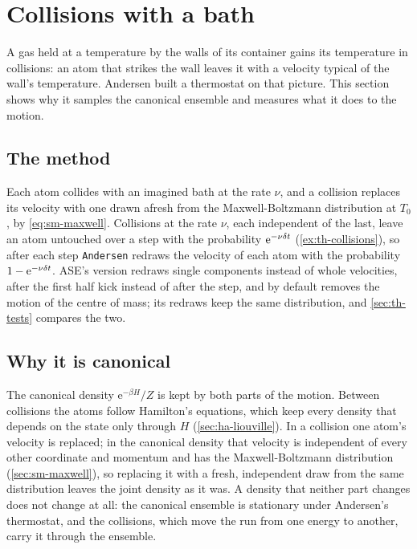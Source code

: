 \section{Collisions with a bath}
\label{sec:th-andersen}

A gas held at a temperature by the walls of its container gains its
temperature in collisions: an atom that strikes the wall leaves it with a
velocity typical of the wall's temperature. Andersen built a thermostat
on that picture\cite{Andersen1980}. This section shows why it samples the
canonical ensemble and measures what it does to the motion.

\subsection*{The method}

Each atom collides with an imagined bath at the rate $\nu$, and a
collision replaces its velocity with one drawn afresh from the
Maxwell-Boltzmann distribution at $T_0$, by \cref{eq:sm-maxwell}.
Collisions at the rate $\nu$, each independent of the last, leave an atom
untouched over a step with the probability $\mathrm{e}^{-\nu\delta t}$
(\cref{ex:th-collisions}), so after each step \texttt{Andersen} redraws
the velocity of each atom with the probability $1 - \mathrm{e}^{-\nu\delta t}$.
ASE's version redraws single components instead of whole velocities,
after the first half kick instead of after the step, and by default
removes the motion of the centre of mass; its redraws keep the same
distribution, and \cref{sec:th-tests} compares the two.

\subsection*{Why it is canonical}

The canonical density $\mathrm{e}^{-\beta H}/Z$ is kept by both parts of
the motion. Between collisions the atoms follow Hamilton's equations,
which keep every density that depends on the state only through $H$
(\cref{sec:ha-liouville}). In a collision one atom's velocity is replaced;
in the canonical density that velocity is independent of every other
coordinate and momentum and has the Maxwell-Boltzmann distribution
(\cref{sec:sm-maxwell}), so replacing it with a fresh, independent draw
from the same distribution leaves the joint density as it was. A density
that neither part changes does not change at all: the canonical ensemble
is stationary under Andersen's thermostat, and the collisions, which move
the run from one energy to another, carry it through the
ensemble\cite{Andersen1980}.

